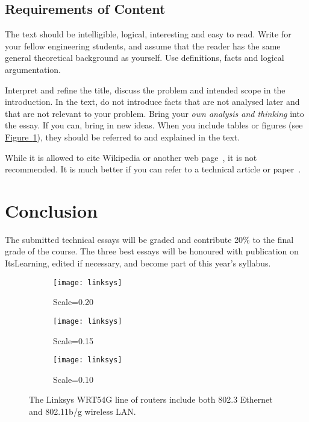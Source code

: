 \documentclass[a4paper,11pt]{article}
\begin{document}
\subsection{Requirements of Content}
 The text should be intelligible, logical, interesting and easy to read. Write for
your fellow engineering students, and assume that the reader has the same general theoretical
background as yourself. Use definitions, facts and logical argumentation. 

Interpret and refine the title, discuss the problem and intended scope in the
introduction. In the text, do not introduce facts that are not analysed later and
that are not relevant to your problem. Bring your \emph{own analysis and thinking} into
the essay. If you can, bring in new ideas. When you include tables or figures (see \hyperref[fig:linksys]{Figure~\ref*{fig:linksys}}), 
they should be referred to and explained in the text.

While it is allowed to cite Wikipedia or another web page~\cite{Wikipedia:citation,Daborn}, 
it is not recommended.
It is much better if you can refer to a technical article or paper~\cite{Kortvedt:2009}.

\section{Conclusion}
The submitted technical essays will be graded and contribute 20\% to the final grade of the course. The three best essays will be honoured with publication on ItsLearning, edited if necessary, and become part of this year's syllabus.

\begin{figure}[hbp]
	\centering
	\begin{subfigure}[b]{0.3\textwidth}
		\centering
		\texttt{[image: linksys]}
		\caption{Scale=0.20}
	\end{subfigure}
	\begin{subfigure}[b]{0.3\textwidth}
		\centering		
		\texttt{[image: linksys]}
		\caption{Scale=0.15}	
	\end{subfigure}
	\begin{subfigure}[b]{0.3\textwidth}
		\centering		
		\texttt{[image: linksys]}
		\caption{Scale=0.10}
	\end{subfigure}
	\caption{The Linksys WRT54G line of routers include both  802.3 Ethernet and 802.11b/g wireless LAN.}
	\label{fig:linksys}
\end{figure}


\label{sec:references}
\end{document}
